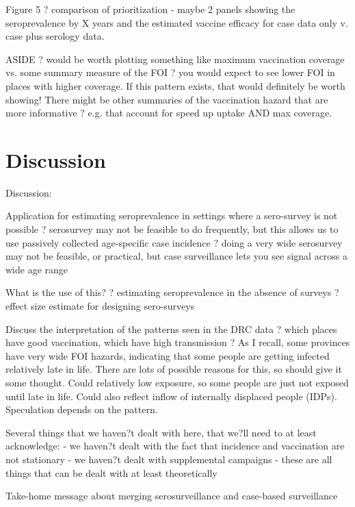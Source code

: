 \documentclass[nofootinbib,aps,pre,twocolumn,superscriptaddress,showkeys,showpacs]{revtex4-1}
\begin{document}
Figure 5 ? comparison of prioritization
	- maybe 2 panels showing the seroprevalence by X years and the estimated vaccine efficacy for case data only v. case plus serology data.

	ASIDE ? would be worth plotting something like maximum vaccination coverage vs. some summary measure of the FOI ? you would expect to see lower FOI in places with higher coverage. If this pattern exists, that would definitely be worth showing!  There might be other summaries of the vaccination hazard that are more informative ? e.g. that account for speed up uptake AND max coverage. 

\section{Discussion \label{sec:Discussion}}
Discussion:

Application for estimating seroprevalence in settings where a sero-survey is not possible 
	? serosurvey may not be feasible to do frequently, but this allows us to use passively collected age-specific case incidence 
	? doing a very wide serosurvey may not be feasible, or practical, but case surveillance lets you see signal across a wide age range

What is the use of this?
	? estimating seroprevalence in the absence of surveys
	? effect size estimate for designing sero-surveys

Discuss the interpretation of the patterns seen in the DRC data 
	? which places have good vaccination, which have high transmission
	? As I recall, some provinces have very wide FOI hazards, indicating that some people are getting infected relatively late in life.  There are lots of possible reasons for this, so should give it some thought.  Could relatively low exposure, so some people are just not exposed until late in life.  Could also reflect inflow of internally displaced people (IDPs).  Speculation depends on the pattern. 

Several things that we haven?t dealt with here, that we?ll need to at least acknowledge:
	- we haven?t dealt with the fact that incidence and vaccination are not stationary
	- we haven?t dealt with supplemental campaigns
	- these are all things that can be dealt with at least theoretically

Take-home message about merging serosurveillance and case-based surveillance



\end{document}
